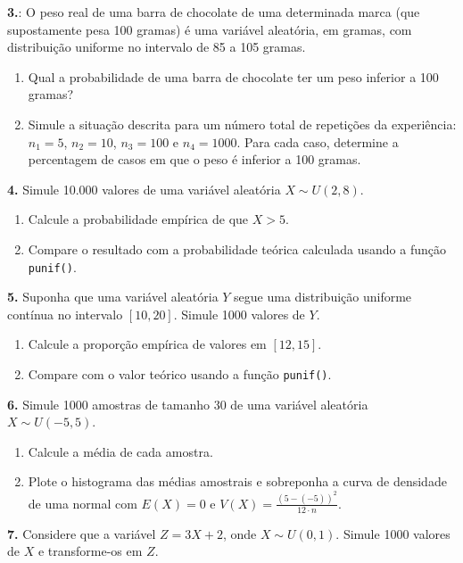 \documentclass[
]{book}
\begin{document}
\textbf{3.}: O peso real de uma barra de chocolate de uma determinada
marca (que supostamente pesa 100 gramas) é uma variável aleatória, em
gramas, com distribuição uniforme no intervalo de 85 a 105 gramas.

\begin{enumerate}
\def\labelenumi{(\alph{enumi})}
\item
  Qual a probabilidade de uma barra de chocolate ter um peso inferior
  a 100 gramas?
\item
  Simule a situação descrita para um número total de repetições da
  experiência: \(n_1=5\), \(n_2=10\), \(n_3=100\) e \(n_4=1000\). Para cada
  caso, determine a percentagem de casos em que o peso é inferior a
  100 gramas.
\end{enumerate}

\textbf{4.} Simule 10.000 valores de uma variável aleatória \(X \sim U(2, 8)\).

\begin{enumerate}
\def\labelenumi{(\alph{enumi})}
\item
  Calcule a probabilidade empírica de que \(X > 5\).
\item
  Compare o resultado com a probabilidade teórica calculada usando a função \texttt{punif()}.
\end{enumerate}

\textbf{5.} Suponha que uma variável aleatória \(Y\) segue uma distribuição uniforme contínua no intervalo \([10, 20]\). Simule 1000 valores de \(Y\).

\begin{enumerate}
\def\labelenumi{(\alph{enumi})}
\item
  Calcule a proporção empírica de valores em \([12, 15]\).
\item
  Compare com o valor teórico usando a função \texttt{punif()}.
\end{enumerate}

\textbf{6.} Simule 1000 amostras de tamanho 30 de uma variável aleatória \(X \sim U(-5, 5)\).

\begin{enumerate}
\def\labelenumi{(\alph{enumi})}
\item
  Calcule a média de cada amostra.
\item
  Plote o histograma das médias amostrais e sobreponha a curva de densidade de uma normal com \(E(X) = 0\) e \(V(X) = \frac{(5 - (-5))^2}{12 \cdot n}\).
\end{enumerate}

\textbf{7.} Considere que a variável \(Z = 3X + 2\), onde \(X \sim U(0, 1)\). Simule 1000 valores de \(X\) e transforme-os em \(Z\).
\end{document}

